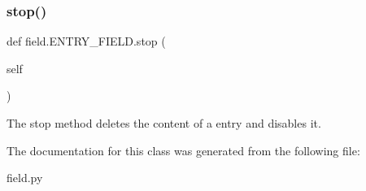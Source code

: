 \subsubsection{\texorpdfstring{stop()}{stop()}}
{\footnotesize\ttfamily def field.\+E\+N\+T\+R\+Y\+\_\+\+F\+I\+E\+L\+D.\+stop (\begin{DoxyParamCaption}\item[{}]{self }\end{DoxyParamCaption})}



The stop method deletes the content of a entry and disables it. 



The documentation for this class was generated from the following file\+:\begin{DoxyCompactItemize}
\item 
field.\+py\end{DoxyCompactItemize}
